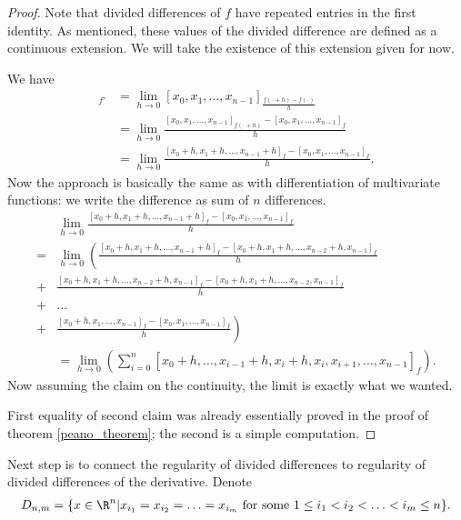 \begin{proof}
	Note that divided differences of $f$ have repeated entries in the first identity. As mentioned, these values of the divided difference are defined as a continuous extension. We will take the existence of this extension given for now.

	We have
	\begin{align*}
		[x_{0}, x_{1}, \ldots, x_{n - 1}]_{f'} &= \lim_{h \to 0} [x_{0}, x_{1}, \ldots, x_{n - 1}]_{\frac{f(\cdot + h) - f(\cdot)}{h}} \\
		&= \lim_{h \to 0} \frac{[x_{0}, x_{1}, \ldots, x_{n - 1}]_{f(\cdot + h)} -[x_{0}, x_{1}, \ldots, x_{n - 1}]_{f}}{h} \\
		&= \lim_{h \to 0} \frac{[x_{0} + h, x_{1} + h, \ldots, x_{n - 1} + h]_{f} -[x_{0}, x_{1}, \ldots, x_{n - 1}]_{f}}{h}.
	\end{align*}
	Now the approach is basically the same as with differentiation of multivariate functions: we write the difference as sum of $n$ differences.
	\begin{align*}
		& \lim_{h \to 0} \frac{[x_{0} + h, x_{1} + h, \ldots, x_{n - 1} + h]_{f} -[x_{0}, x_{1}, \ldots, x_{n - 1}]_{f}}{h} \\
		=& \lim_{h \to 0} \left(\frac{[x_{0} + h, x_{1} + h, \ldots, x_{n - 1} + h]_{f} - [x_{0} + h, x_{1} + h, \ldots, x_{n - 2} + h,  x_{n - 1}]_{f}}{h} \right. \\
		+& \frac{[x_{0} + h, x_{1} + h, \ldots, x_{n - 2} + h, x_{n - 1}]_{f} - [x_{0} + h, x_{1} + h, \ldots, x_{n - 2}, x_{n - 1}]_{f}}{h} \\
		+& \ldots \\
		+& \left. \frac{[x_{0} + h, x_{1}, \ldots, x_{n - 1}]_{f} - [x_{0}, x_{1}, \ldots, x_{n - 1}]_{f}}{h} \right)\\
		&= \lim_{h \to 0} \left(\sum_{i = 0}^{n} [x_{0} + h, \ldots, x_{i - 1} + h, x_{i} + h, x_{i}, x_{i + 1}, \ldots, x_{n - 1}]_{f} \right).
	\end{align*}
	Now assuming the claim on the continuity, the limit is exactly what we wanted.

	First equality of second claim was already essentially proved in the proof of theorem \ref{peano_theorem}; the second is a simple computation.
\end{proof}

Next step is to connect the regularity of divided differences to regularity of divided differences of the derivative. Denote
\begin{align*}
	D_{n, m} = \{x \in \R^{n} | x_{i_{1}} = x_{i_{2}} = \ldots = x_{i_{m}} \text{ for some $1 \leq i_{1} < i_{2} < \ldots < i_{m} \leq n$} \}.
\end{align*}

